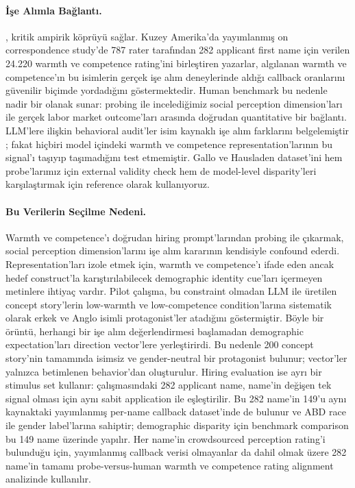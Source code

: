 \documentclass[twocolumn]{article}
\begin{document}
\paragraph{İşe Alımla Bağlantı.}
\citet{gallo2024warmth}, kritik ampirik köprüyü sağlar. Kuzey Amerika'da
yayımlanmış on correspondence study'de 787 rater tarafından 282 applicant first
name için verilen 24.220 warmth ve competence rating'ini birleştiren yazarlar,
algılanan warmth ve competence'ın bu isimlerin gerçek işe alım deneylerinde
aldığı callback oranlarını güvenilir biçimde yordadığını göstermektedir. Human
benchmark bu nedenle nadir bir olanak sunar: probing ile incelediğimiz social
perception dimension'ları ile gerçek labor market outcome'ları arasında doğrudan
quantitative bir bağlantı. LLM'lere ilişkin behavioral audit'ler isim kaynaklı
işe alım farklarını belgelemiştir \citep{an2024llm, an_measuring_2025,
gaebler2024auditing}; fakat hiçbiri model içindeki warmth ve competence
representation'larının bu signal'ı taşıyıp taşımadığını test etmemiştir. Gallo
ve Hausladen dataset'ini hem probe'larımız için external validity check hem de
model-level disparity'leri karşılaştırmak için reference olarak kullanıyoruz.

\paragraph{Bu Verilerin Seçilme Nedeni.}
Warmth ve competence'ı doğrudan hiring prompt'larından probing ile çıkarmak,
social perception dimension'larını işe alım kararının kendisiyle confound ederdi.
Representation'ları izole etmek için, warmth ve competence'ı ifade eden ancak
hedef construct'la karıştırılabilecek demographic identity cue'ları içermeyen
metinlere ihtiyaç vardır. Pilot çalışma, bu constraint olmadan LLM ile üretilen
concept story'lerin low-warmth ve low-competence condition'larına sistematik
olarak erkek ve Anglo isimli protagonist'ler atadığını göstermiştir. Böyle bir
örüntü, herhangi bir işe alım değerlendirmesi başlamadan demographic
expectation'ları direction vector'lere yerleştirirdi. Bu nedenle 200 concept
story'nin tamamında isimsiz ve gender-neutral bir protagonist bulunur; vector'ler
yalnızca betimlenen behavior'dan oluşturulur. Hiring evaluation ise ayrı bir
stimulus set kullanır: \citet{gallo2024warmth} çalışmasındaki 282 applicant name,
name'in değişen tek signal olması için aynı sabit application ile eşleştirilir.
Bu 282 name'in 149'u aynı kaynaktaki yayımlanmış per-name callback dataset'inde
de bulunur ve ABD race ile gender label'larına sahiptir; demographic disparity
için benchmark comparison bu 149 name üzerinde yapılır. Her name'in crowdsourced
perception rating'i bulunduğu için, yayımlanmış callback verisi olmayanlar da
dahil olmak üzere 282 name'in tamamı probe-versus-human warmth ve competence
rating alignment analizinde kullanılır.
\end{document}
